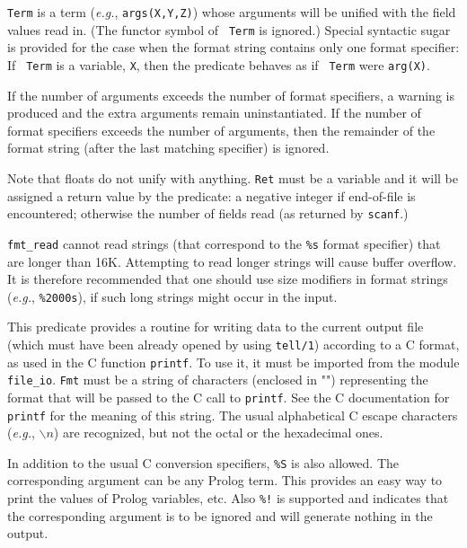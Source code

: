 \begin{description}
    {\tt Term} is a term ({\it e.g.}, {\tt args(X,Y,Z)})  whose arguments
    will be unified with the field values read in.  (The functor symbol of {\tt
    Term} is ignored.)  Special syntactic sugar is provided for the case
    when the format string contains only one format specifier: If {\tt
    Term} is a variable, {\tt X}, then the predicate behaves as if {\tt
    Term} were {\tt arg(X)}.

  If the number of arguments exceeds the number of format specifiers, a
  warning is produced and the extra arguments remain uninstantiated.
  If the number of format specifiers exceeds the number of arguments, then
  the remainder of the format string (after the last matching specifier) is
  ignored.
  
  Note that floats do not unify with anything.  {\tt Ret} must be a
  variable and it will be assigned a return value by the predicate: a
  negative integer if end-of-file is encountered; otherwise the number of
  fields read (as returned by {\tt scanf}.)
  
  {\tt fmt\_read} cannot read strings (that correspond to the {\tt \%s}
  format specifier) that are longer than 16K. Attempting to read longer
  strings will cause buffer overflow. It is therefore recommended that one
  should use size modifiers in format strings ({\it e.g.}, {\tt \%2000s}),
  if such long strings might occur in the input.

\vspace{-7mm}
    This predicate provides a routine for writing data to
    the current output file (which must have been already opened by using
    {\tt tell/1}) according to a C format, as used in the C function
    {\tt printf}.
    To use it, it must be imported from the module {\tt file\_io}.
    {\tt Fmt} must be a string of characters (enclosed in "")
    representing the format that 
    will be passed to the C call to {\tt printf}.  See the C
    documentation for {\tt printf} for the meaning of this string.
    The usual alphabetical C escape characters ({\it e.g.}, $\backslash n$)
    are recognized, but not the octal or the hexadecimal ones.

    In addition to the usual C conversion specifiers, {\tt \%S} is also
    allowed. The corresponding argument can be any Prolog term. This
    provides an easy way to print the values of Prolog variables, etc.  
    Also {\tt \%!} is supported and indicates that the corresponding argument
    is to be ignored and will generate nothing in the output.


\end{description}
